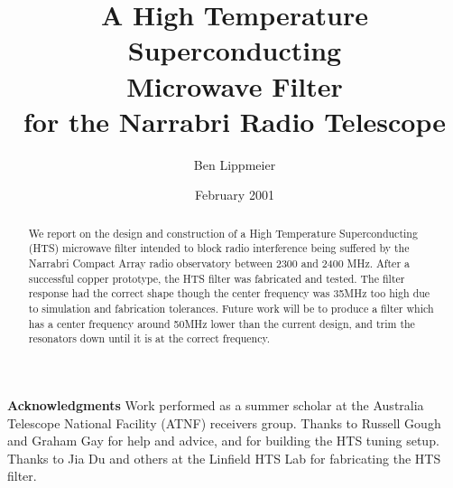 \documentclass{article}[12pt]
\begin{document}
\title	{A High Temperature Superconducting\\ Microwave Filter \\ for the Narrabri Radio Telescope}
\author	{Ben Lippmeier}
\date	{February 2001}

\maketitle

\begin{abstract}
We report on the design and construction of a High Temperature Superconducting (HTS) microwave filter intended to block radio interference being suffered by the Narrabri Compact Array radio observatory between 2300 and 2400 MHz. After a successful copper prototype, the HTS filter was fabricated and tested. The filter response had the correct shape though the center frequency was 35MHz too high due to simulation and fabrication tolerances. Future work will be to produce a filter which has a center frequency around 50MHz lower than the current design, and trim the resonators down until it is at the correct frequency.
\end{abstract}







\medskip
\textbf{Acknowledgments}
Work performed as a summer scholar at the Australia Telescope National Facility (ATNF) receivers group. Thanks to Russell Gough and Graham Gay for help and advice, and for building the HTS tuning setup. Thanks to Jia Du and others at the Linfield HTS Lab for fabricating the HTS filter.

\clearpage{}


\end{document}
